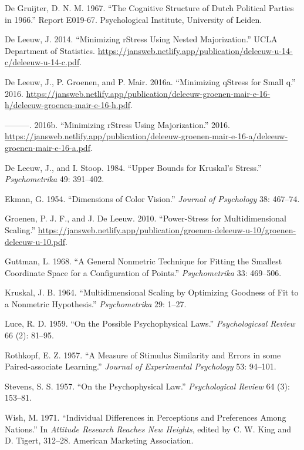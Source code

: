 \documentclass[
  12pt,
]{article}
\newlength{\cslhangindent}
\newenvironment{CSLReferences}[2] %
 {\begin{list}{}{%
  \setlength{\itemindent}{0pt}
  \setlength{\leftmargin}{0pt}
  \setlength{\parsep}{0pt}
  \ifodd #1
   \setlength{\leftmargin}{\cslhangindent}
   \setlength{\itemindent}{-1\cslhangindent}
  \fi
  \setlength{\itemsep}{#2\baselineskip}}}
 {\end{list}}
\begin{document}
\label{refs}
\begin{CSLReferences}{1}{0}
De Gruijter, D. N. M. 1967. {``{The Cognitive Structure of Dutch Political Parties in 1966}.''} Report E019-67. Psychological Institute, University of Leiden.

De Leeuw, J. 2014. {``{Minimizing rStress Using Nested Majorization}.''} UCLA Department of Statistics. \url{https://jansweb.netlify.app/publication/deleeuw-u-14-c/deleeuw-u-14-c.pdf}.

De Leeuw, J., P. Groenen, and P. Mair. 2016a. {``Minimizing qStress for Small q.''} 2016. \url{https://jansweb.netlify.app/publication/deleeuw-groenen-mair-e-16-h/deleeuw-groenen-mair-e-16-h.pdf}.

---------. 2016b. {``{Minimizing rStress Using Majorization}.''} 2016. \url{https://jansweb.netlify.app/publication/deleeuw-groenen-mair-e-16-a/deleeuw-groenen-mair-e-16-a.pdf}.

De Leeuw, J., and I. Stoop. 1984. {``Upper Bounds for Kruskal's Stress.''} \emph{Psychometrika} 49: 391--402.

Ekman, G. 1954. {``{Dimensions of Color Vision}.''} \emph{Journal of Psychology} 38: 467--74.

Groenen, P. J. F., and J. De Leeuw. 2010. {``{Power-Stress for Multidimensional Scaling}.''} \url{https://jansweb.netlify.app/publication/groenen-deleeuw-u-10/groenen-deleeuw-u-10.pdf}.

Guttman, L. 1968. {``{A General Nonmetric Technique for Fitting the Smallest Coordinate Space for a Configuration of Points}.''} \emph{Psychometrika} 33: 469--506.

Kruskal, J. B. 1964. {``{Multidimensional Scaling by Optimizing Goodness of Fit to a Nonmetric Hypothesis}.''} \emph{Psychometrika} 29: 1--27.

Luce, R. D. 1959. {``On the Possible Psychophysical Laws.''} \emph{Psychologicsal Review} 66 (2): 81--95.

Rothkopf, E. Z. 1957. {``{A Measure of Stimulus Similarity and Errors in some Paired-associate Learning}.''} \emph{Journal of Experimental Psychology} 53: 94--101.

Stevens, S. S. 1957. {``On the Psychophysical Law.''} \emph{Psychological Review} 64 (3): 153--81.

Wish, M. 1971. {``Individual Differences in Perceptions and Preferences Among Nations.''} In \emph{Attitude Research Reaches New Heights}, edited by C. W. King and D. Tigert, 312--28. American Marketing Association.

\end{CSLReferences}
\end{document}
